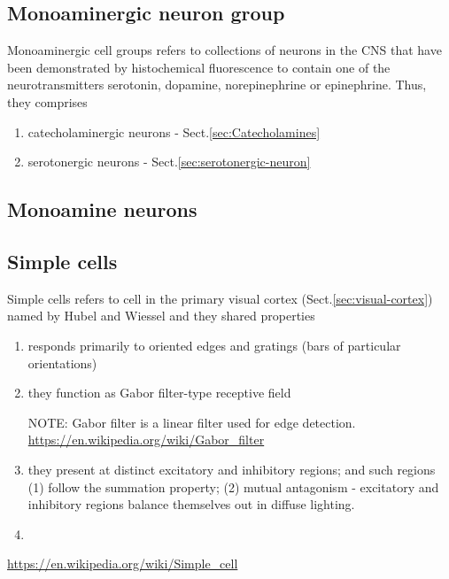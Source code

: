 \subsection{Monoaminergic neuron group}
\label{sec:monoaminergic-neuron-group}

Monoaminergic cell groups refers to collections of neurons in the CNS that have
been demonstrated by histochemical fluorescence to contain one of the
neurotransmitters serotonin, dopamine, norepinephrine or epinephrine.
Thus, they comprises
\begin{enumerate}
  \item catecholaminergic neurons - Sect.\ref{sec:Catecholamines}
  \item serotonergic neurons - Sect.\ref{sec:serotonergic-neuron}
\end{enumerate}

\subsection{Monoamine neurons}
\label{sec:monoamine-neuron}

\subsection{Simple cells}
\label{sec:simple-cell}

Simple cells refers to cell in the primary visual cortex
(Sect.\ref{sec:visual-cortex}) named by Hubel and Wiessel and they shared
properties
\begin{enumerate}
  \item responds primarily to oriented edges and gratings (bars of particular
  orientations)
  
  \item they function as Gabor filter-type receptive field 

NOTE: Gabor filter is a linear filter used for edge detection. 
\url{https://en.wikipedia.org/wiki/Gabor_filter}
  
  \item they present at  distinct  excitatory and inhibitory regions; and
  such  regions (1) follow the summation property; (2)
  mutual antagonism - excitatory and inhibitory regions balance themselves out
  in diffuse lighting.
  
  \item 
\end{enumerate}

\url{https://en.wikipedia.org/wiki/Simple_cell}

